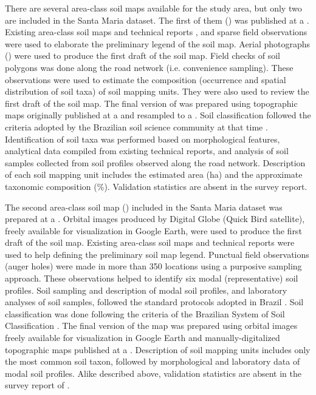 There are several area-class soil maps available for the study area, but only two are included in the Santa 
Maria dataset. The first of them (\soilOld{}) was published at a  \cite{AzolinEtAl1988}. 
Existing area-class soil maps and technical reports \cite{Brasil1973, Azolin1977, MacielEtAl1987a, 
MacielEtAl1987, AbraoEtAl1988}, and sparse field observations were used to elaborate the preliminary legend of 
the soil map. Aerial photographs () were used to produce the first draft of the soil map. Field 
checks of soil polygons was done along the road network (i.e. convenience sampling). These observations were 
used to estimate the composition (occurrence and spatial distribution of soil taxa) of soil mapping units. They 
were also used to review the first draft of the soil map. The final version of \soilOld{} was prepared using 
topographic maps originally published at a  and resampled to a . Soil classification 
followed the criteria adopted by the Brazilian soil science community at that time \cite{Brasil1973, 
CamargoEtAl1982, Carvalho1982, LemosEtAl1982, OlmosEtAl1982}. Identification of soil taxa was performed based 
on morphological features, analytical data compiled from existing technical reports, and analysis of soil 
samples collected from soil profiles observed along the road network. Description of each soil mapping unit 
includes the estimated area (\si{\hectare}) and the approximate taxonomic composition (\si{\percent}). 
Validation statistics are absent in the survey report.

The second area-class soil map (\soilNew{}) included in the Santa Maria dataset \cite{Miguel2010} was prepared 
at a . Orbital images produced by Digital Globe\textregistered{} (Quick Bird satellite), freely 
available for visualization in Google Earth\textregistered{}, were used to produce the first draft of the soil 
map. Existing area-class soil maps and technical reports \cite{Pedron2005, Poelking2007, Sturmer2008} were used 
to help defining the preliminary soil map legend. Punctual field observations (auger holes) were made in more 
than \num{350} locations using a purposive sampling approach. These observations helped to identify six 
modal (representative) soil profiles. Soil sampling and description of modal soil profiles, and laboratory 
analyses of soil samples, followed the standard protocols adopted in Brazil \cite{ClaessenEtAl1997, 
SantosEtAl2005}. Soil classification was done following the criteria of the Brazilian System of Soil 
Classification \cite{SantosEtAl2006}. The final version of the map was prepared using orbital images freely 
available for visualization in Google Earth\textregistered{} and manually-digitalized topographic maps 
published at a  \cite{DSG1992a, DSG1992}. Description of soil mapping units includes only the 
most common soil taxon, followed by morphological and laboratory data of modal soil profiles. Alike \soilOld{} 
described above, validation statistics are absent in the survey report of \soilNew{}.

